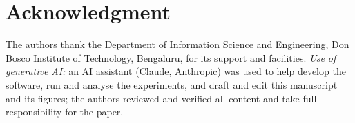 \documentclass[conference]{IEEEtran}
\begin{document}
\section*{Acknowledgment}

The authors thank the Department of Information Science and Engineering, Don Bosco Institute of Technology, Bengaluru, for its support and facilities. \emph{Use of generative AI:} an AI assistant (Claude, Anthropic) was used to help develop the software, run and analyse the experiments, and draft and edit this manuscript and its figures; the authors reviewed and verified all content and take full responsibility for the paper.



\end{document}
